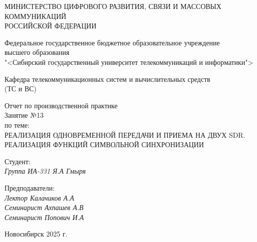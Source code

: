 \thispagestyle{empty}

\begin{center}
    МИНИСТЕРСТВО ЦИФРОВОГО РАЗВИТИЯ, СВЯЗИ И МАССОВЫХ КОММУНИКАЦИЙ \\ РОССИЙСКОЙ ФЕДЕРАЦИИ

    \vspace{20pt}

    Федеральное государственное бюджетное образовательное учреждение  \\  высшего образования \\
    "<Сибирский государственный университет телекоммуникаций и информатики"> \\

    \vspace{20pt}

    Кафедра телекоммуникационных систем и вычислительных средств \\  (ТС и ВС)
\end{center}

\vfill

\begin{center}
    Отчет по производственной практике \\  
    Занятие №13 \\

    \vspace{20pt}
    по теме: \\
    \uppercase{Реализация одновременной передачи и приема на двух SDR. Реализация функций символьной синхронизации}
\end{center}

\vfill

    \noindent Студент: \\
    \textit{Группа ИА-331 \hfill Я.А Гмыря}

    \vspace{20pt}

    \noindent Предподаватели: \\
    \textit{Лектор \hfill Калачиков А.А} \\
    \textit{Семинарист \hfill Ахпашев А.В} \\
    \textit{Семинарист \hfill Попович И.А}

\vfill

\begin{center}
    Новосибирск 2025 г.
\end{center}